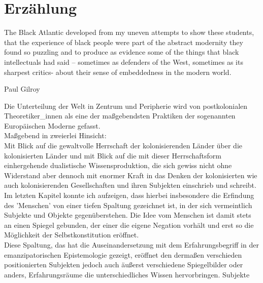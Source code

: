 \section{Erzählung}
\epigraph{
The Black Atlantic developed from my uneven attempts to show these students, that the experience of black people were part of the abstract modernity they found so puzzling and to produce as evidence some of the things that black intellectuals had said – sometimes as defenders of the West, sometimes as its sharpest critics- about their sense of embeddedness in the modern world.
}{Paul Gilroy\footnotemark} 

Die Unterteilung der Welt in Zentrum und Peripherie wird von postkolonialen
Theoretiker\_innen als eine der maßgebendsten Praktiken der sogenannten
Europäischen Moderne gefasst. \\
Maßgebend in zweierlei Hinsicht:\\
Mit Blick auf
die gewaltvolle Herrschaft der kolonisierenden Länder über die kolonisierten
Länder und mit Blick auf die mit dieser Herrschaftsform einhergehende
dualistische Wissensproduktion, die sich gewiss nicht ohne
Widerstand\footnotemark {} aber
dennoch mit enormer Kraft in das Denken der kolonisierten wie auch
kolonisierenden Gesellschaften und ihren Subjekten einschrieb und
schreibt.\footnotemark {} 
\\
Im letzten Kapitel konnte ich aufzeigen, dass hierbei
insbesondere die Erfindung des 'Menschen' von einer tiefen Spaltung gezeichnet
ist, in der sich vermeintlich Subjekte und Objekte gegenüberstehen. Die Idee
vom Menschen ist damit stets an einen Spiegel gebunden, der einer die eigene
Negation vorhält und erst so die Möglichkeit der Selbstkonstitution eröffnet.\\
Diese Spaltung, das hat die Auseinandersetzung mit dem Erfahrungsbegriff in der
emanzipatorischen Epistemologie gezeigt, eröffnet den dermaßen verschieden
positionierten Subjekten jedoch auch äußerst verschiedene Spiegelbilder oder
anders, Erfahrungsräume die unterschiedliches Wissen hervorbringen. Subjekte

